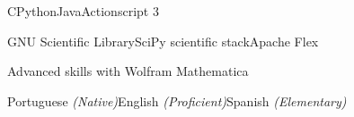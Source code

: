

\begin{cvskills}
	
	{C\dotsep Python\dotsep Java\dotsep Actionscript 3}
	
	{GNU Scientific Library\dotsep SciPy scientific stack\dotsep Apache Flex}
	
	{Advanced skills with Wolfram Mathematica}
	
	
	{Portuguese \textit{(Native)}\dotsep English \textit{(Proficient)}\dotsep Spanish \textit{(Elementary)}}
	
\end{cvskills}
